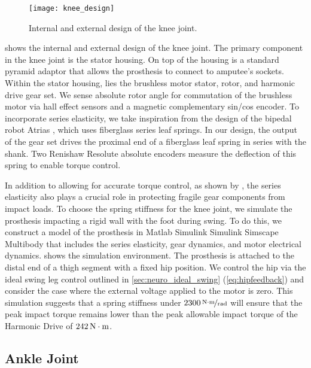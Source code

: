 \begin{figure*}[t]
    \centering 
    \texttt{[image: knee\_design]}
    \caption{Internal and external design of the knee 
    joint.}\label{fig:knee_design}
\end{figure*}
 shows the internal and external design of the knee joint.
The primary component in the knee joint is the stator housing. On top of the
housing is a standard pyramid adaptor that allows the prosthesis to connect to
amputee's sockets. Within the stator housing, lies the brushless motor stator,
rotor, and harmonic drive gear set. We sense absolute rotor angle for
commutation of the brushless motor via hall effect sensors and a magnetic
complementary sin/cos encoder. To incorporate series elasticity, we take
inspiration from the design of the bipedal robot Atrias
\citep{grimes2013atrias}, which uses fiberglass series leaf springs. In our
design, the output of the gear set drives the proximal end of a fiberglass leaf
spring in series with the shank. Two Renishaw Resolute absolute encoders measure
the deflection of this spring to enable torque control.

In addition to allowing for accurate torque control, as shown by
\citet{au2007biomechanical,au2008powered}, the series elasticity also plays a
crucial role in protecting fragile gear components from impact loads. To choose
the spring stiffness for the knee joint, we simulate the prosthesis impacting a
rigid wall with the foot during swing. To do this, we construct a model of the
prosthesis in Matlab Simulink Simulink Simscape Multibody that includes the
series elasticity, gear dynamics, and motor electrical dynamics.  shows
the simulation environment. The prosthesis is attached to the distal end of a
thigh segment with a fixed hip position. We control the hip via the ideal swing
leg control outlined in \cref{sec:neuro_ideal_swing} (\cref{eq:hipfeedback}) and
consider the case where the external voltage applied to the motor is zero. This
simulation suggests that a spring stiffness under $\unitfrac[2300]{N \cdot
m}{rad}$ will ensure that the peak impact torque remains lower than the peak
allowable impact torque of the Harmonic Drive of $\unit[242]{N \cdot m}$.

\subsection{Ankle Joint}

